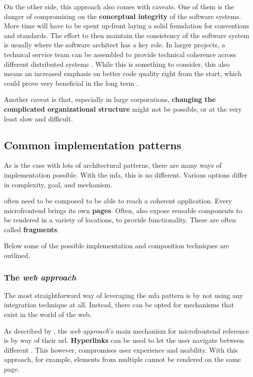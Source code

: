 On the other side, this approach also comes with caveats. One of them is the
danger of compromising on the \textbf{conceptual integrity} of the software
systems. More time will have to be spent up-front laying a solid foundation for
conventions and standards. The effort to then maintain the consistency of the
software system is usually where the software architect has a key role. In
larger projects, a technical service team can be assembled to provide technical
coherence across different distributed systems \autocite{Smite_etal_2010}. While
this is something to consider, this also means an increased emphasis on better
code quality right from the start, which could prove very beneficial in the long
term \autocite{LarmanVodde_2008}.

Another caveat is that, especially in large corporations, \textbf{changing the
complicated organizational structure} might not be possible, or at the very
least slow and difficult.

\subsection{Common implementation patterns}
\label{ssec:mf-implementation-patterns}

As is the case with lots of architectural patterns, there are many ways of
implementation possible. With the \gls{mfa}, this is no different. Various
options differ in complexity, goal, and mechanism. 

 often need to be composed to be able to reach a
coherent application. Every \Gls{microfrontend} brings its own \textbf{pages}.
Often,  also expose reusable components to be rendered
in a variety of locations, to provide functionality. These are often called
\textbf{fragments}.

Below some of the possible implementation and composition techniques are
outlined.

\subsubsection{The \textit{web approach}}

The most straightforward way of leveraging the \gls{mfa} pattern is by not using
any integration technique at all. Instead, there can be opted for mechanisms
that exist in the world of the web. 

As described by \textcite{Rappl_2021}, the \textit{web approach}'s main
mechanism for \gls{microfrontend} reference is by way of their \gls{url}.
\textbf{Hyperlinks} can be used to let the user navigate between different
. This however, compromises user experience and
usability. With this approach, for example, elements from multiple
 cannot be rendered on the same page. 

